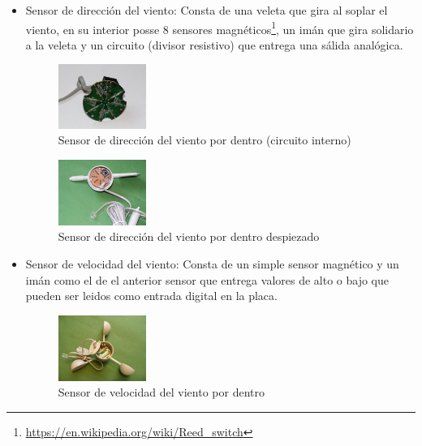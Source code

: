 \documentclass[10pt]{article}
\begin{document}
\begin{itemize}
   \item Sensor de dirección del viento: Consta de una veleta que gira al soplar el viento, en su interior posse 8 sensores magnéticos\footnote{\url{https://en.wikipedia.org/wiki/Reed_switch}}, un imán que gira solidario a la veleta y un circuito (divisor resistivo) que entrega una sálida analógica.
               \begin{figure}[H]
                  \centering
                  \includegraphics[width=0.27\textwidth]{./Images/winddir1.jpg}
                  \caption{Sensor de dirección del viento por dentro (circuito interno)}\label{fig:veleta_por_dentro}
               \end{figure}
               \begin{figure}[H]
                  \centering
                  \includegraphics[width=0.27\textwidth]{./Images/winddir2.jpg}
                  \caption{Sensor de dirección del viento por dentro despiezado}\label{fig:veleta_por_dentro2}
               \end{figure}
   \item Sensor de velocidad del viento: Consta de un simple sensor magnético y un imán como el de el anterior sensor que entrega valores de alto o bajo que pueden ser leidos como entrada digital en la placa.
               \begin{figure}[H]
                  \centering
                  \includegraphics[width=0.27\textwidth]{./Images/windspeed1.jpg}
                  \caption{Sensor de velocidad del viento por dentro}\label{fig:anemometro}
               \end{figure}

\end{itemize}
\end{document}
